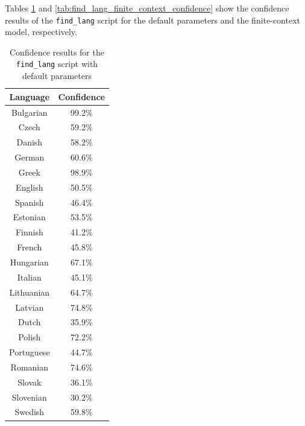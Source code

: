 \documentclass{article}
\begin{document}
Tables \ref{tab:find_lang_default_confidence} and \ref{tab:find_lang_finite_context_confidence} show the confidence results of the \texttt{find_lang} script for the default parameters and the finite-context model, respectively.

\begin{table}
    \centering
    \begin{tabular}{|c|c|}
        \hline
        Language & Confidence \\
        \hline
        Bulgarian & 99.2\% \\
        Czech & 59.2\% \\
        Danish & 58.2\% \\
        German & 60.6\% \\
        Greek & 98.9\% \\
        English & 50.5\% \\
        Spanish & 46.4\% \\
        Estonian & 53.5\% \\
        Finnish & 41.2\% \\
        French & 45.8\% \\
        Hungarian & 67.1\% \\
        Italian & 45.1\% \\
        Lithuanian & 64.7\% \\
        Latvian & 74.8\% \\
        Dutch & 35.9\% \\
        Polish & 72.2\% \\
        Portuguese & 44.7\% \\
        Romanian & 74.6\% \\
        Slovak & 36.1\% \\
        Slovenian & 30.2\% \\
        Swedish & 59.8\% \\
        \hline
    \end{tabular}
    \caption{Confidence results for the \texttt{find\_lang} script with default parameters}
    \label{tab:find_lang_default_confidence}
\end{table}
\end{document}
